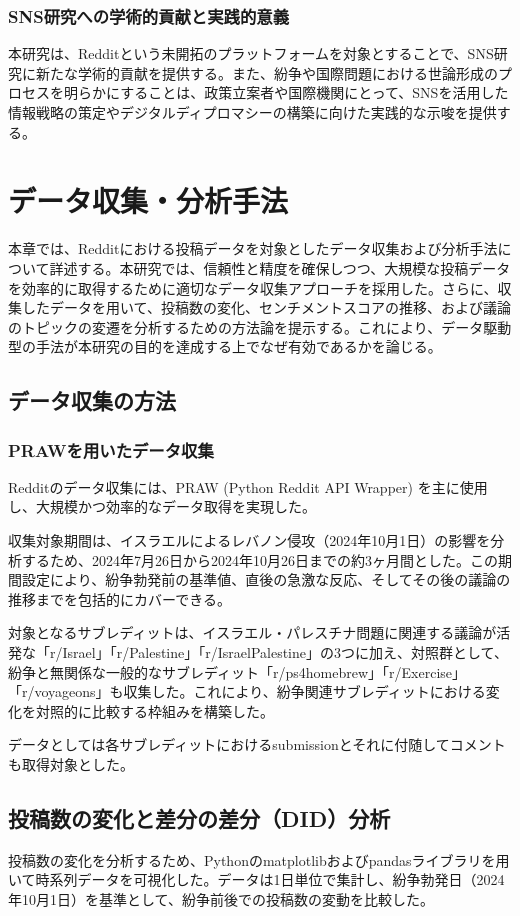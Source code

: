 \documentclass[11pt, a4j]{jreport}
\begin{document}
    \subsection{SNS研究への学術的貢献と実践的意義}
    本研究は、Redditという未開拓のプラットフォームを対象とすることで、SNS研究に新たな学術的貢献を提供する。また、紛争や国際問題における世論形成のプロセスを明らかにすることは、政策立案者や国際機関にとって、SNSを活用した情報戦略の策定やデジタルディプロマシーの構築に向けた実践的な示唆を提供する。

    \chapter{データ収集・分析手法}
    本章では、Redditにおける投稿データを対象としたデータ収集および分析手法について詳述する。本研究では、信頼性と精度を確保しつつ、大規模な投稿データを効率的に取得するために適切なデータ収集アプローチを採用した。さらに、収集したデータを用いて、投稿数の変化、センチメントスコアの推移、および議論のトピックの変遷を分析するための方法論を提示する。これにより、データ駆動型の手法が本研究の目的を達成する上でなぜ有効であるかを論じる。

    \section{データ収集の方法}
    \subsection{PRAWを用いたデータ収集}
    Redditのデータ収集には、PRAW (Python Reddit API Wrapper) を主に使用し、大規模かつ効率的なデータ取得を実現した。

    収集対象期間は、イスラエルによるレバノン侵攻（2024年10月1日）の影響を分析するため、2024年7月26日から2024年10月26日までの約3ヶ月間とした。この期間設定により、紛争勃発前の基準値、直後の急激な反応、そしてその後の議論の推移までを包括的にカバーできる。

    対象となるサブレディットは、イスラエル・パレスチナ問題に関連する議論が活発な「r/Israel」「r/Palestine」「r/IsraelPalestine」の3つに加え、対照群として、紛争と無関係な一般的なサブレディット「r/ps4homebrew」「r/Exercise」「r/voyageons」も収集した。これにより、紛争関連サブレディットにおける変化を対照的に比較する枠組みを構築した。

    データとしては各サブレディットにおけるsubmissionとそれに付随してコメントも取得対象とした。

    \section{投稿数の変化と差分の差分（DID）分析}
    投稿数の変化を分析するため、Pythonのmatplotlibおよびpandasライブラリを用いて時系列データを可視化した。データは1日単位で集計し、紛争勃発日（2024年10月1日）を基準として、紛争前後での投稿数の変動を比較した。
\end{document}
